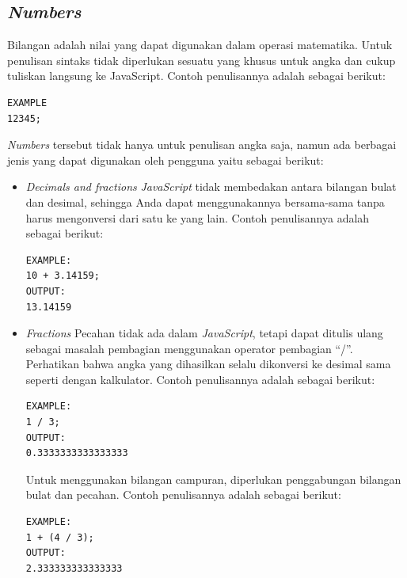\subsection{\textit{Numbers}}
\label{sec: Numbers}
   Bilangan adalah nilai yang dapat digunakan dalam operasi matematika\cite{javascriptlearn}. Untuk penulisan sintaks tidak diperlukan sesuatu yang khusus untuk angka dan cukup tuliskan langsung ke JavaScript. Contoh penulisannya adalah sebagai berikut: 
    \begin{lstlisting}[basicstyle=\ttfamily, frame=single,
    columns=fullflexible, breaklines=true, numbers=none]
EXAMPLE
12345;
    \end{lstlisting}
    \textit{Numbers} tersebut tidak hanya untuk penulisan angka saja, namun ada berbagai jenis yang dapat digunakan oleh pengguna yaitu sebagai berikut: 
    \begin{itemize}
        \item \textit{Decimals and fractions}\newline
        \textit{JavaScript} tidak membedakan antara bilangan bulat dan desimal, sehingga Anda dapat menggunakannya bersama-sama tanpa harus mengonversi dari satu ke yang lain. Contoh penulisannya adalah sebagai berikut: 
        \begin{lstlisting}[basicstyle=\ttfamily, frame=single,
        columns=fullflexible, breaklines=true, numbers=none]
EXAMPLE:
10 + 3.14159;
OUTPUT:
13.14159
        \end{lstlisting}
        \item \textit{Fractions}\newline
        Pecahan tidak ada dalam \textit{JavaScript}, tetapi dapat ditulis ulang sebagai masalah pembagian menggunakan operator pembagian ``/''. Perhatikan bahwa angka yang dihasilkan selalu dikonversi ke desimal sama seperti dengan kalkulator. Contoh penulisannya adalah sebagai berikut: 
        \begin{lstlisting}[basicstyle=\ttfamily, frame=single,
        columns=fullflexible, breaklines=true, numbers=none]
EXAMPLE:
1 / 3;
OUTPUT:
0.3333333333333333
        \end{lstlisting}
        Untuk menggunakan bilangan campuran, diperlukan penggabungan bilangan bulat dan pecahan. Contoh penulisannya adalah sebagai berikut: 
        \begin{lstlisting}[basicstyle=\ttfamily, frame=single,
    columns=fullflexible, breaklines=true, numbers=none]
EXAMPLE:
1 + (4 / 3);
OUTPUT:
2.333333333333333
        \end{lstlisting}

\end{itemize}
